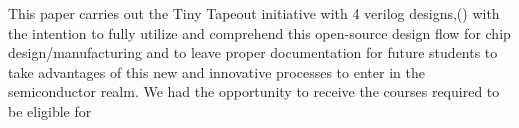 This paper carries out the Tiny Tapeout initiative with 4 verilog designs,() with the intention to fully utilize and comprehend this open-source design flow for chip design/manufacturing and to leave proper documentation for future students to take advantages of this new and innovative processes to enter in the semiconductor realm. We had the opportunity to receive the courses required to be eligible for 
